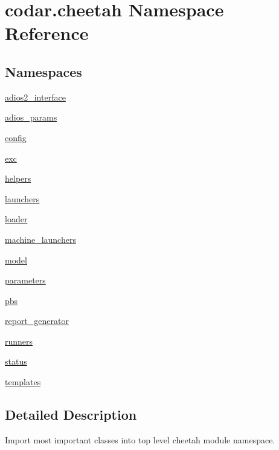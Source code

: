 \hypertarget{namespacecodar_1_1cheetah}{}\section{codar.\+cheetah Namespace Reference}
\label{namespacecodar_1_1cheetah}
\subsection*{Namespaces}
\begin{DoxyCompactItemize}
\item 
 \hyperlink{namespacecodar_1_1cheetah_1_1adios2__interface}{adios2\+\_\+interface}
\item 
 \hyperlink{namespacecodar_1_1cheetah_1_1adios__params}{adios\+\_\+params}
\item 
 \hyperlink{namespacecodar_1_1cheetah_1_1config}{config}
\item 
 \hyperlink{namespacecodar_1_1cheetah_1_1exc}{exc}
\item 
 \hyperlink{namespacecodar_1_1cheetah_1_1helpers}{helpers}
\item 
 \hyperlink{namespacecodar_1_1cheetah_1_1launchers}{launchers}
\item 
 \hyperlink{namespacecodar_1_1cheetah_1_1loader}{loader}
\item 
 \hyperlink{namespacecodar_1_1cheetah_1_1machine__launchers}{machine\+\_\+launchers}
\item 
 \hyperlink{namespacecodar_1_1cheetah_1_1model}{model}
\item 
 \hyperlink{namespacecodar_1_1cheetah_1_1parameters}{parameters}
\item 
 \hyperlink{namespacecodar_1_1cheetah_1_1pbs}{pbs}
\item 
 \hyperlink{namespacecodar_1_1cheetah_1_1report__generator}{report\+\_\+generator}
\item 
 \hyperlink{namespacecodar_1_1cheetah_1_1runners}{runners}
\item 
 \hyperlink{namespacecodar_1_1cheetah_1_1status}{status}
\item 
 \hyperlink{namespacecodar_1_1cheetah_1_1templates}{templates}
\end{DoxyCompactItemize}


\subsection{Detailed Description}
\begin{DoxyVerb}Import most important classes into top level cheetah module namespace.
\end{DoxyVerb}
 